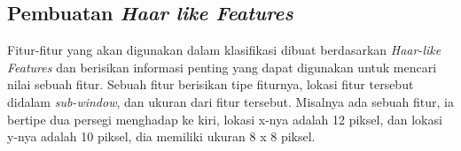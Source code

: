 


\subsection{Pembuatan \textit{Haar like Features}}

Fitur-fitur yang akan digunakan dalam klasifikasi dibuat 
berdasarkan \emph{Haar-like Features} dan berisikan informasi penting yang dapat digunakan 
untuk mencari nilai sebuah fitur. Sebuah fitur berisikan tipe fiturnya, lokasi fitur tersebut 
didalam \textit{sub-window}, dan ukuran dari fitur tersebut.
Misalnya ada sebuah fitur, ia bertipe dua persegi menghadap ke kiri, lokasi x-nya adalah 12 piksel, 
dan lokasi y-nya adalah 10 piksel, dia memiliki ukuran 8 x 8 piksel.

